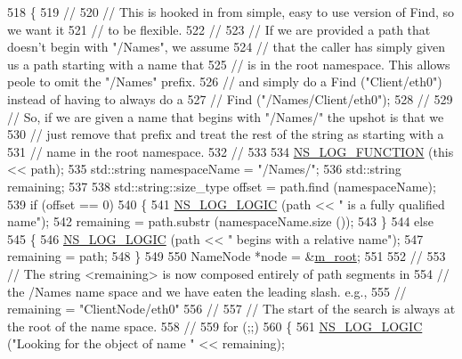 \begin{DoxyCode}
518 \{
519   \textcolor{comment}{//}
520   \textcolor{comment}{// This is hooked in from simple, easy to use version of Find, so we want it}
521   \textcolor{comment}{// to be flexible.}
522   \textcolor{comment}{//}
523   \textcolor{comment}{// If we are provided a path that doesn't begin with "/Names", we assume }
524   \textcolor{comment}{// that the caller has simply given us a path starting with a name that}
525   \textcolor{comment}{// is in the root namespace.  This allows peole to omit the "/Names" prefix.}
526   \textcolor{comment}{// and simply do a Find ("Client/eth0") instead of having to always do a}
527   \textcolor{comment}{// Find ("/Names/Client/eth0");}
528   \textcolor{comment}{//}
529   \textcolor{comment}{// So, if we are given a name that begins with "/Names/" the upshot is that we}
530   \textcolor{comment}{// just remove that prefix and treat the rest of the string as starting with a }
531   \textcolor{comment}{// name in the root namespace.}
532   \textcolor{comment}{//}
533 
534   \hyperlink{log-macros-disabled_8h_a90b90d5bad1f39cb1b64923ea94c0761}{NS\_LOG\_FUNCTION} (\textcolor{keyword}{this} << path);
535   std::string namespaceName = \textcolor{stringliteral}{"/Names/"};
536   std::string remaining;
537 
538   std::string::size\_type offset = path.find (namespaceName);
539   \textcolor{keywordflow}{if} (offset == 0)
540     \{
541       \hyperlink{group__logging_ga88acd260151caf2db9c0fc84997f45ce}{NS\_LOG\_LOGIC} (path << \textcolor{stringliteral}{" is a fully qualified name"});
542       remaining = path.substr (namespaceName.size ());
543     \}
544   \textcolor{keywordflow}{else}
545     \{
546       \hyperlink{group__logging_ga88acd260151caf2db9c0fc84997f45ce}{NS\_LOG\_LOGIC} (path << \textcolor{stringliteral}{" begins with a relative name"});
547       remaining = path;
548     \}
549 
550   NameNode *node = &\hyperlink{classns3_1_1NamesPriv_a24851b2ca8230416228472b2e4e1b587}{m\_root};
551 
552   \textcolor{comment}{//}
553   \textcolor{comment}{// The string <remaining> is now composed entirely of path segments in}
554   \textcolor{comment}{// the /Names name space and we have eaten the leading slash. e.g., }
555   \textcolor{comment}{// remaining = "ClientNode/eth0"}
556   \textcolor{comment}{//}
557   \textcolor{comment}{// The start of the search is always at the root of the name space.}
558   \textcolor{comment}{//}
559   \textcolor{keywordflow}{for} (;;)
560     \{
561       \hyperlink{group__logging_ga88acd260151caf2db9c0fc84997f45ce}{NS\_LOG\_LOGIC} (\textcolor{stringliteral}{"Looking for the object of name "} << remaining);

\end{DoxyCode}
